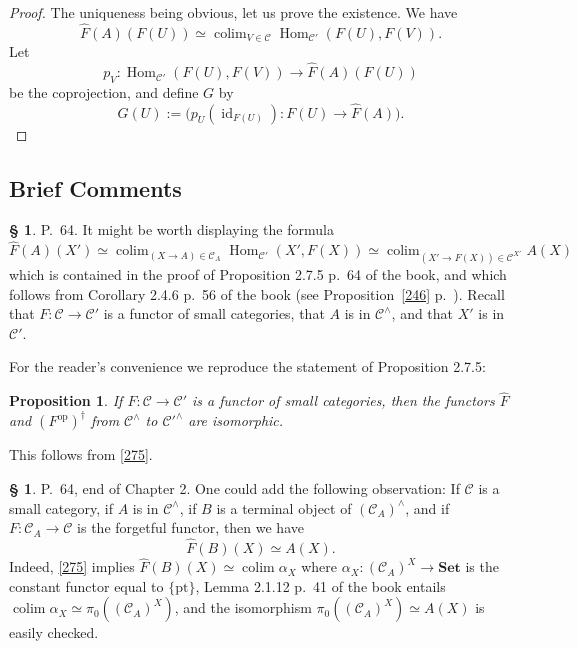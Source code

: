\documentclass[12pt]{article}%
\newtheorem{prop}[thm]{Proposition}
\theoremstyle{remark}
\theoremstyle{definition}
\newtheorem{s}[thm]{\S}%
\newcommand{\C}{\mathcal C}
\newcommand{\Set}{\mathbf{Set}}%
\newcommand{\pt}{\{\text{pt}\}}
\DeclareMathOperator*{\colim}{colim}%
\DeclareMathOperator*{\col}{colim}
\DeclareMathOperator{\id}{id}
\DeclareMathOperator{\Hom}{Hom}%
\DeclareMathOperator{\op}{op}
\begin{document}
\begin{proof}
The uniqueness being obvious, let us prove the existence. We have 
$$
\widehat F(A)(F(U))\simeq\col_{V\in\C}\Hom_{\C'}(F(U),F(V)).
$$ 
Let 
$$
p_V:\Hom_{\C'}(F(U),F(V))\to\widehat F(A)(F(U))
$$ 
be the coprojection, and define $G$ by 
$$
G(U):=\big(p_U(\id_{F(U)}):F(U)\to\widehat F(A)\big).
$$ 
\end{proof}


\subsection{Brief Comments}

\begin{s} 
P.~64. It might be worth displaying the formula 
\begin{equation}\label{275}
\widehat F(A)(X')\simeq\colim_{(X\to A)\in\C_A}\Hom_{\C'}(X',F(X))\simeq
\colim_{(X'\to F(X))\in\C^{X'}}A(X)
\end{equation}
which is contained in the proof of Proposition 2.7.5 p.~64 of the book, and which follows from Corollary 2.4.6 p.~56 of the book (see Proposition~\ref{246} p.~\pageref{246}). Recall that $F:\C\to\C'$ is a functor of small categories, that $A$ is in $\C^\wedge$, and that $X'$ is in $\C'$. 

For the reader's convenience we reproduce the statement of Proposition 2.7.5: 

\begin{prop}
If $F:\C\to\C'$ is a functor of small categories, then the functors $\widehat F$ and $(F^{\op})^\dagger$ from $\C^\wedge$ to $\C'^\wedge$ are isomorphic. 
\end{prop} 

This follows from \eqref{275}.
\end{s}
%

\begin{s}
P.~64, end of Chapter 2. One could add the following observation: If $\C$ is a small category, if $A$ is in $\C^\wedge$, if $B$ is a terminal object of $(\C_A)^\wedge$, and if $F:\C_A\to\C$ is the forgetful functor, then we have 
\begin{equation}\label{1725}
\widehat F(B)(X)\simeq A(X).
\end{equation}
Indeed, \eqref{275} implies $\widehat F(B)(X)\simeq\colim\alpha_X$ where $\alpha_X:(\C_A)^X\to\Set$ is the constant functor equal to $\pt$, Lemma 2.1.12 p.~41 of the book entails $\colim\alpha_X\simeq\pi_0((\C_A)^X)$, and the isomorphism $\pi_0((\C_A)^X)\simeq A(X)$ is easily checked.
\end{s}
\end{document}
